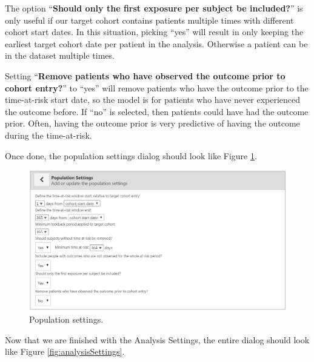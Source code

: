 \documentclass[11pt]{book}
\theoremstyle{definition}
\theoremstyle{definition}
\theoremstyle{definition}
\theoremstyle{remark}
\begin{document}
The option ``\textbf{Should only the first exposure per subject be included?}'' is only useful if our target cohort contains patients multiple times with different cohort start dates. In this situation, picking ``yes'' will result in only keeping the earliest target cohort date per patient in the analysis. Otherwise a patient can be in the dataset multiple times.

Setting ``\textbf{Remove patients who have observed the outcome prior to cohort entry?}'' to ``yes'' will remove patients who have the outcome prior to the time-at-risk start date, so the model is for patients who have never experienced the outcome before. If ``no'' is selected, then patients could have had the outcome prior. Often, having the outcome prior is very predictive of having the outcome during the time-at-risk.

Once done, the population settings dialog should look like Figure \ref{fig:populationSettings}.

\begin{figure}

{\centering \includegraphics[width=1\linewidth]{images/PatientLevelPrediction/populationSettings} 

}

\caption{Population settings.}\label{fig:populationSettings}
\end{figure}

Now that we are finished with the Analysis Settings, the entire dialog should look like Figure \ref{fig:analysisSettings}.
\end{document}
